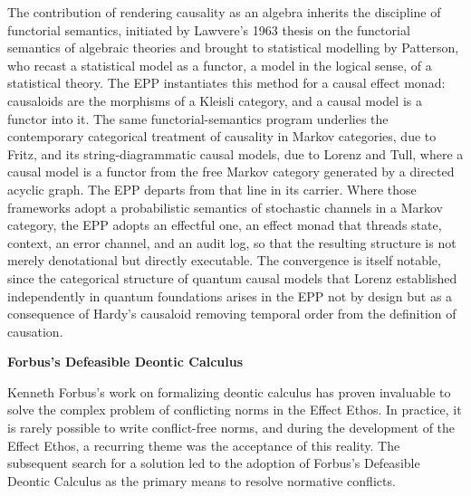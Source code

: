 The contribution of rendering causality as an algebra inherits the discipline of functorial semantics, initiated by Lawvere's 1963 thesis on the functorial semantics of algebraic theories and brought to statistical modelling by Patterson, who recast a statistical model as a functor, a model in the logical sense, of a statistical theory. The EPP instantiates this method for a causal effect monad: causaloids are the morphisms of a Kleisli category, and a causal model is a functor into it. The same functorial-semantics program underlies the contemporary categorical treatment of causality in Markov categories, due to Fritz, and its string-diagrammatic causal models, due to Lorenz and Tull, where a causal model is a functor from the free Markov category generated by a directed acyclic graph. The EPP departs from that line in its carrier. Where those frameworks adopt a probabilistic semantics of stochastic channels in a Markov category, the EPP adopts an effectful one, an effect monad that threads state, context, an error channel, and an audit log, so that the resulting structure is not merely denotational but directly executable. The convergence is itself notable, since the categorical structure of quantum causal models that Lorenz established independently in quantum foundations arises in the EPP not by design but as a consequence of Hardy's causaloid removing temporal order from the definition of causation.



\textbf{Forbus's Defeasible Deontic Calculus}

Kenneth Forbus's work on formalizing deontic calculus \cite{olson2024DDIC} has proven invaluable to solve the complex problem of conflicting norms in the Effect Ethos. In practice, it is rarely possible to write conflict-free norms, and during the development of the Effect Ethos, a recurring theme was the acceptance of this reality. The subsequent search for a solution led to the adoption of Forbus's Defeasible Deontic Calculus as the primary means to resolve normative conflicts.

